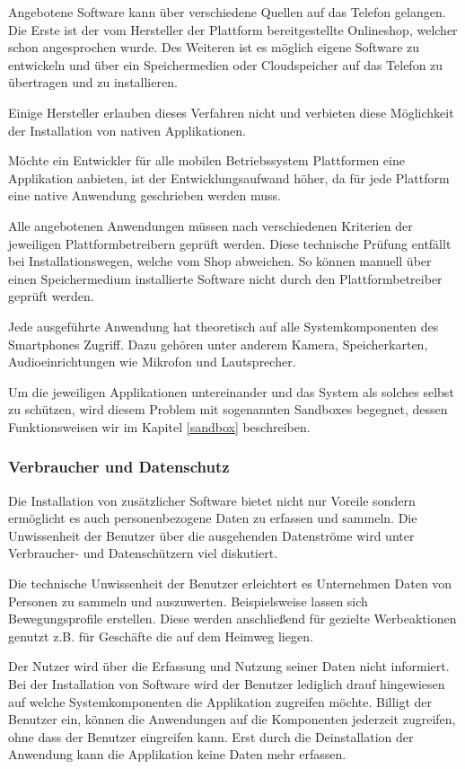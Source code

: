 Angebotene Software kann über verschiedene Quellen auf das Telefon gelangen. Die Erste ist der vom Hersteller der Plattform bereitgestellte Onlineshop, welcher schon angesprochen wurde. Des Weiteren ist es möglich eigene Software zu entwickeln und über ein Speichermedien oder Cloudspeicher auf das Telefon zu übertragen und zu installieren.

Einige Hersteller erlauben dieses Verfahren nicht und verbieten diese Möglichkeit der Installation von nativen Applikationen.

Möchte ein Entwickler für alle mobilen Betriebssystem Plattformen eine Applikation anbieten, ist der Entwicklungsaufwand höher, da für jede Plattform eine native Anwendung geschrieben werden muss.

Alle angebotenen Anwendungen müssen nach verschiedenen Kriterien der jeweiligen Plattformbetreibern geprüft werden. Diese technische Prüfung entfällt bei Installationswegen, welche vom Shop abweichen. So können manuell über einen Speichermedium installierte Software nicht durch den Plattformbetreiber geprüft werden.

Jede ausgeführte Anwendung hat theoretisch auf alle Systemkomponenten des Smartphones Zugriff. Dazu gehören unter anderem Kamera, Speicherkarten, Audioeinrichtungen wie Mikrofon und Lautsprecher.

Um die jeweiligen Applikationen untereinander und das System als solches selbst zu schützen, wird diesem Problem mit sogenannten Sandboxes begegnet, dessen Funktionsweisen wir im Kapitel \ref{sandbox} beschreiben.

\subsubsection{Verbraucher und Datenschutz}

Die Installation von zusätzlicher Software bietet nicht nur Voreile sondern ermöglicht es auch personenbezogene Daten zu erfassen und sammeln. Die Unwissenheit der Benutzer über die ausgehenden Datenströme wird unter Verbraucher- und Datenschützern viel diskutiert.

Die technische Unwissenheit der Benutzer erleichtert es Unternehmen Daten von Personen zu sammeln und auszuwerten. Beispielsweise lassen sich Bewegungsprofile erstellen. Diese werden anschließend für gezielte Werbeaktionen genutzt z.B. für Geschäfte die auf dem Heimweg liegen.

Der Nutzer wird über die Erfassung und Nutzung seiner Daten nicht informiert. Bei der Installation von Software wird der Benutzer lediglich drauf hingewiesen auf welche Systemkomponenten die Applikation zugreifen möchte. Billigt der Benutzer ein, können die Anwendungen auf die Komponenten jederzeit zugreifen, ohne dass der Benutzer eingreifen kann. Erst durch die Deinstallation der Anwendung kann die Applikation keine Daten mehr erfassen.

